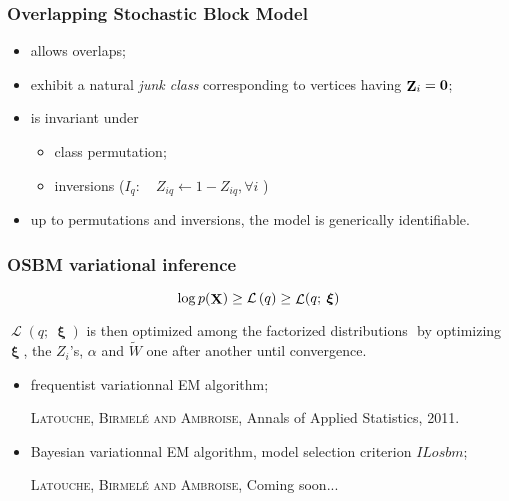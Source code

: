 \documentclass{beamer}
\DeclareMathOperator{\bZ}{{\bf Z}}
\DeclareMathOperator{\bX}{{\bf X}}
\DeclareMathOperator{\LowerBound}{\mathcal{L}}
\DeclareMathOperator{\bxi}{\boldsymbol{\xi}}
\begin{document}
\begin{frame}
\frametitle{Overlapping Stochastic Block Model}

\begin{itemize}
\item allows overlaps;
\item exhibit a natural {\em junk class} corresponding to vertices having $\bZ_i={\bf 0}$;
\item is invariant under
  \begin{itemize}
   \item class permutation;
   \item inversions ($I_q: \quad Z_{iq} \leftarrow 1 -Z_{iq}, \forall i$ )
  \end{itemize}
\item up to permutations and inversions, the model is generically identifiable.
\end{itemize}


\end{frame}






\begin{frame}
\frametitle{OSBM variational inference}

\begin{equation*}
 \log p(\bX) \geq  \mathcal{L}\left(q\right) \geq \LowerBound(q;\:\bxi)
\end{equation*}

$\LowerBound(q;\:\bxi)$ is then optimized among the factorized distributions
$ $ by optimizing $\bxi$, the $Z_i$'s,  $\alpha$ and  $\tilde{W}$  one after another until convergence. 

\begin{itemize}
\item frequentist variationnal EM algorithm;

{\tiny \textsc{Latouche, Birmel\'e and Ambroise}, Annals of Applied Statistics, 2011.}

\item Bayesian variationnal EM algorithm, model selection criterion $ILosbm$;

{\tiny \textsc{Latouche, Birmel\'e and Ambroise}, Coming soon...}
\end{itemize}





\end{frame}


\end{document}
